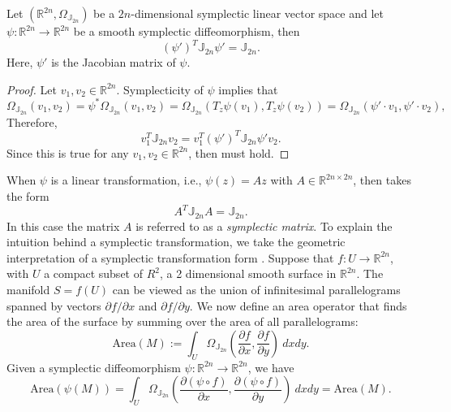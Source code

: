 \begin{proposition}
Let $(\mathbb R^{2n}, \Omega_{\mathbb J_{2n}})$ be a $2n$-dimensional symplectic linear vector space and let $\psi:\mathbb R^{2n} \to \mathbb R^{2n}$ be a smooth symplectic diffeomorphism, then
\begin{equation} \label{eq:2.20}
	(\psi')^T \mathbb J_{2n} \psi' =  \mathbb J_{2n}.	
\end{equation}
Here, $\psi'$ is the Jacobian matrix of $\psi$.
\end{proposition}
\begin{proof}
Let $v_1,v_2\in \mathbb R^{2n}$. Symplecticity of $\psi$ implies that
\begin{equation*}
	\Omega_{\mathbb J_{2n}}(v_1,v_2) = \psi^*\Omega_{\mathbb J_{2n}}(v_1,v_2) = \Omega_{\mathbb J_{2n}}( T_z \psi(v_1) , T_z \psi (v_2) ) = \Omega_{\mathbb J_{2n}}( \psi'\cdot v_1,\psi'\cdot v_2 ),
\end{equation*}
Therefore,
\begin{equation*}
	v_1^T \mathbb J_{2n} v_2 = v_1^T (\psi')^T \mathbb J_{2n} \psi' v_2.
\end{equation*}
Since this is true for any $v_1,v_2\in \mathbb R^{2n}$, then  must hold.
\end{proof}
When $\psi$ is a linear transformation, i.e., $\psi(z) = Az$ with $A\in \mathbb R^{2n\times 2n}$, then  takes the form
\begin{equation} \label{eq:2.201}
	A^T \mathbb J_{2n} A = \mathbb J_{2n}.
\end{equation}
In this case the matrix $A$ is referred to as a \emph{symplectic matrix}. To explain the intuition behind a symplectic transformation, we take the geometric interpretation of a symplectic transformation form \cite{hairer2006geometric}. Suppose that $f:U \to \mathbb R^{2n}$, with $U$ a compact subset of $R^{2}$, a 2 dimensional smooth surface in $\mathbb R^{2n}$. The manifold $S = f(U)$ can be viewed as the union of infinitesimal parallelograms spanned by vectors ${\partial f}/{\partial x}$ and ${\partial f}/{\partial y}$. We now define an area operator that finds the area of the surface by summing over the area of all parallelograms:
\begin{equation} \label{eq:2.21}
	\text{Area}(M) := \int_U \Omega_{\mathbb J_{2n}}( \frac{\partial f}{\partial x} , \frac{\partial f}{\partial y} ) \ dx dy.
\end{equation}
Given a symplectic diffeomorphism $\psi:\mathbb R^{2n} \to \mathbb R^{2n}$, we have
\begin{equation*}
	\text{Area}(\psi(M)) = \int_U \Omega_{\mathbb J_{2n}}( \frac{\partial (\psi \circ f) }{\partial x} , \frac{\partial (\psi \circ f)}{\partial y} ) \ dx dy = \text{Area}(M).
\end{equation*}
